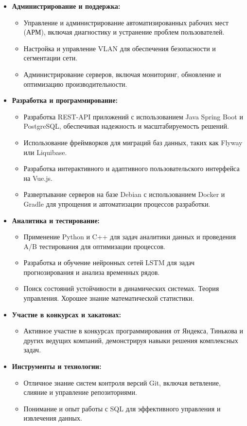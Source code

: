 \documentclass[a4paper,10pt]{article}
\begin{document}
\begin{itemize}
    \item \textbf{Администрирование и поддержка:}
    \begin{itemize}
        \item Управление и администрирование автоматизированных рабочих мест (АРМ), включая диагностику и устранение проблем пользователей.
        \item Настройка и управление VLAN для обеспечения безопасности и сегментации сети.
        \item Администрирование серверов, включая мониторинг, обновление и оптимизацию производительности.
    \end{itemize}

    \item \textbf{Разработка и программирование:}
    \begin{itemize}
        \item Разработка REST-API приложений с использованием Java Spring Boot и PostgreSQL, обеспечивая надежность и масштабируемость решений.
        \item Использование фреймворков для миграций баз данных, таких как Flyway или Liquibase.
        \item Разработка интерактивного и адаптивного пользовательского интерфейса на Vue.js.
        \item Развертывание серверов на базе Debian с использованием Docker и Gradle для упрощения и автоматизации процессов разработки.
    \end{itemize}

    \item \textbf{Аналитика и тестирование:}
    \begin{itemize}
        \item Применение Python и C++ для задач аналитики данных и проведения A/B тестирования для оптимизации процессов.
        \item Разработка и обучение нейронных сетей LSTM для задач прогнозирования и анализа временных рядов.
        \item Поиск состояний устойчивости в динамических системах. Теория управления. Хорошее знание математической статистики. 
    \end{itemize}

    \item \textbf{Участие в конкурсах и хакатонах:}
    \begin{itemize}
        \item Активное участие в конкурсах программирования от Яндекса, Тинькова и других ведущих компаний, демонстрируя навыки решения комплексных задач.
    \end{itemize}

    \item \textbf{Инструменты и технологии:}
    \begin{itemize}
        \item Отличное знание систем контроля версий Git, включая ветвление, слияние и управление репозиториями.
        \item Понимание и опыт работы с SQL для эффективного управления и извлечения данных.
    \end{itemize}
\end{itemize}
\end{document}

